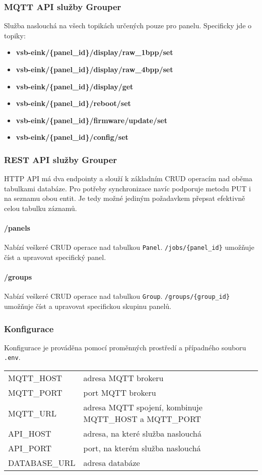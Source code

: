 \subsubsection{MQTT API služby Grouper}
Služba naslouchá na všech topikách určených pouze pro panelu. Specificky jde o topiky:
\begin{itemize}
    \item \textbf{vsb-eink/\{panel\_id\}/display/raw\_1bpp/set}
    \item \textbf{vsb-eink/\{panel\_id\}/display/raw\_4bpp/set}
    \item \textbf{vsb-eink/\{panel\_id\}/display/get}
    \item \textbf{vsb-eink/\{panel\_id\}/reboot/set}
    \item \textbf{vsb-eink/\{panel\_id\}/firmware/update/set}
    \item \textbf{vsb-eink/\{panel\_id\}/config/set}
\end{itemize}

\subsubsection{REST API služby Grouper}
HTTP API má dva endpointy a slouží k základním CRUD operacím nad oběma tabulkami databáze. Pro potřeby synchronizace navíc podporuje metodu PUT i na seznamu obou entit. Je tedy možné jediným požadavkem přepsat efektivně celou tabulku záznamů.

\paragraph*{/panels}
Nabízí veškeré CRUD operace nad tabulkou \lstinline|Panel|. \lstinline|/jobs/{panel_id}| umožňuje číst a upravovat specifický panel.

\paragraph*{/groups}
Nabízí veškeré CRUD operace nad tabulkou \lstinline|Group|. \lstinline|/groups/{group_id}| umožňuje číst a upravovat specifickou skupinu panelů.

\subsubsection{Konfigurace}
Konfigurace je prováděna pomocí proměnných prostředí a případného souboru \lstinline{.env}.
\begin{table}[h]
    \begin{tabular}{ll}
        MQTT\_HOST & adresa MQTT brokeru \\
        MQTT\_PORT & port MQTT brokeru \\
        MQTT\_URL & adresa MQTT spojení, kombinuje MQTT\_HOST a MQTT\_PORT \\
        API\_HOST & adresa, na které služba naslouchá \\
        API\_PORT & port, na kterém služba naslouchá \\
        DATABASE\_URL & adresa databáze \\
    \end{tabular}
\end{table}

